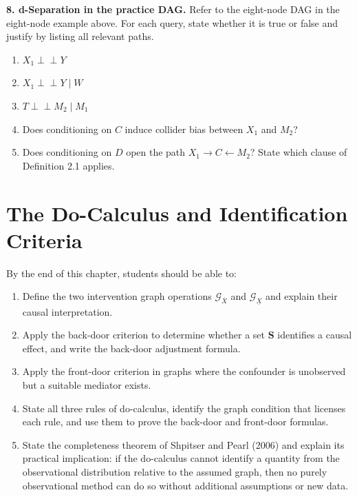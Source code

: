 \documentclass[
  a4paper,
]{book}
\providecommand{\tightlist}{%
  \setlength{\itemsep}{0pt}\setlength{\parskip}{0pt}}
\newcommand{\indep}{\perp\!\!\!\perp}
\newcommand{\Gcal}{\mathcal{G}}
\begin{document}
\textbf{8. d-Separation in the practice DAG.} Refer to the eight-node
DAG in the eight-node example above. For each query, state whether it is
true or false and justify by listing all relevant paths.

\begin{enumerate}
\def\labelenumi{(\alph{enumi})}
\tightlist
\item
  \(X_1 \indep Y\)
\item
  \(X_1 \indep Y \mid W\)
\item
  \(T \indep M_2 \mid M_1\)
\item
  Does conditioning on \(C\) induce collider bias between \(X_1\) and
  \(M_2\)?
\item
  Does conditioning on \(D\) open the path \(X_1 \to C \leftarrow M_2\)?
  State which clause of Definition 2.1 applies.
\end{enumerate}


\chapter{The Do-Calculus and Identification
Criteria}\label{the-do-calculus-and-identification-criteria}

\begin{tcolorbox}[enhanced jigsaw, arc=.35mm, bottomrule=.15mm, bottomtitle=1mm, breakable, colback=white, colbacktitle=quarto-callout-note-color!10!white, colframe=quarto-callout-note-color-frame, coltitle=black, left=2mm, leftrule=.75mm, opacityback=0, opacitybacktitle=0.6, rightrule=.15mm, title={Learning Objectives}, titlerule=0mm, toprule=.15mm, toptitle=1mm]

By the end of this chapter, students should be able to:

\begin{enumerate}
\def\labelenumi{\arabic{enumi}.}
\tightlist
\item
  Define the two intervention graph operations \(\Gcal_{\overline{X}}\)
  and \(\Gcal_{\underline{X}}\) and explain their causal interpretation.
\item
  Apply the back-door criterion to determine whether a set
  \(\mathbf{S}\) identifies a causal effect, and write the back-door
  adjustment formula.
\item
  Apply the front-door criterion in graphs where the confounder is
  unobserved but a suitable mediator exists.
\item
  State all three rules of do-calculus, identify the graph condition
  that licenses each rule, and use them to prove the back-door and
  front-door formulas.
\item
  State the completeness theorem of Shpitser and Pearl (2006) and
  explain its practical implication: if the do-calculus cannot identify
  a quantity from the observational distribution relative to the assumed
  graph, then no purely observational method can do so without
  additional assumptions or new data.
\end{enumerate}

\end{tcolorbox}
\end{document}
